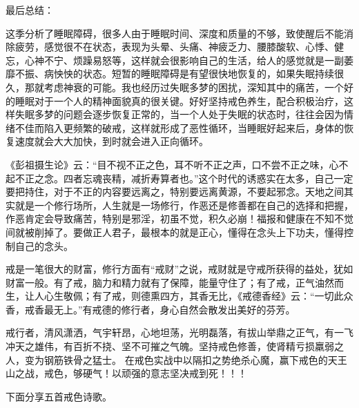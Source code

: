 最后总结：

这季分析了睡眠障碍，很多人由于睡眠时间、深度和质量的不够，致使醒后不能消除疲劳，感觉很不在状态，表现为头晕、头痛、神疲乏力、腰膝酸软、心悸、健忘，心神不宁、烦躁易怒等，这样就会很影响自己的生活，给人的感觉就是一副萎靡不振、病怏怏的状态。短暂的睡眠障碍是有望很快地恢复的，如果失眠持续很久，那就考虑神衰的可能。我也经历过失眠多梦的困扰，深知其中的痛苦，一个好的睡眠对于一个人的精神面貌真的很关键。好好坚持戒色养生，配合积极治疗，这样失眠多梦的问题会逐步恢复正常的，当一个人处于失眠的状态时，往往会因为情绪不佳而陷入更频繁的破戒，这样就形成了恶性循环，当睡眠好起来后，身体的恢复速度就会大大加快，到时就会进入正向循环。

《彭祖摄生论》云：“目不视不正之色，耳不听不正之声，口不尝不正之味，心不起不正之念。四者忘魂丧精，减折寿算者也。”这个时代的诱惑实在太多，自己一定要把持住，对于不正的内容要远离之，特别要远离黄源，不要起邪念。天地之间其实就是一个修行场所，人生就是一场修行，作恶还是修善都在自己的选择和把握，作恶肯定会导致痛苦，特别是邪淫，初虽不觉，积久必崩！福报和健康在不知不觉间就被削掉了。要做正人君子，最根本的就是正心，懂得在念头上下功夫，懂得控制自己的念头。

戒是一笔很大的财富，修行方面有“戒财”之说，戒财就是守戒所获得的益处，犹如财富一般。有了戒，脑力和精力就有了保障，能量守住了；有了戒，正气油然而生，让人心生敬佩；有了戒，则德熏四方，其香无比，《戒德香经》云：“一切此众香，戒香最无上。”有戒德的修行者，身心自然会散发出美好的芬芳。

戒行者，清风潇洒，气宇轩昂，心地坦荡，光明磊落，有拔山举鼎之正气，有一飞冲天之雄伟，有百折不挠、坚不可摧之气魄。坚持戒色修善，使肾精亏损羸弱之人，变为钢筋铁骨之猛士。 在戒色实战中以隔扣之势绝杀心魔，赢下戒色的天王山之战，戒色，够硬气！以顽强的意志坚决戒到死！！！

下面分享五首戒色诗歌。

